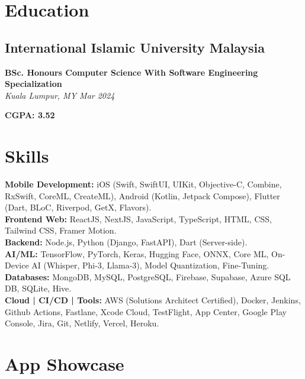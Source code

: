 \documentclass[10pt,letterpaper]{article} %
\newcommand{\jobDetailsLine}[1]{\noindent\textit{#1}\par\vspace{0.5ex}}
\newcommand{\skillCategory}[1]{\noindent\textbf{#1: }}
\begin{document}
\section{Education}
\subsection*{International Islamic University Malaysia} %
\noindent\textbf{BSc. Honours Computer Science With Software Engineering Specialization} \\
\jobDetailsLine{Kuala Lumpur, MY \textbullet{} Mar 2024}
\textbf{CGPA: 3.52}

\section{Skills}
\skillCategory{Mobile Development} iOS (Swift, SwiftUI, UIKit, Objective-C, Combine, RxSwift, CoreML, CreateML), Android (Kotlin, Jetpack Compose), Flutter (Dart, BLoC, Riverpod, GetX, Flavors). \\ \vspace{0.5ex}
\skillCategory{Frontend Web} ReactJS, NextJS, JavaScript, TypeScript, HTML, CSS, Tailwind CSS, Framer Motion. \\ \vspace{0.5ex}
\skillCategory{Backend} Node.js, Python (Django, FastAPI), Dart (Server-side). \\ \vspace{0.5ex}
\skillCategory{AI/ML} TensorFlow, PyTorch, Keras, Hugging Face, ONNX, Core ML, On-Device AI (Whisper, Phi-3, Llama-3), Model Quantization, Fine-Tuning. \\ \vspace{0.5ex}
\skillCategory{Databases} MongoDB, MySQL, PostgreSQL, Firebase, Supabase, Azure SQL DB, SQLite, Hive. \\ \vspace{0.5ex}
\skillCategory{Cloud | CI/CD | Tools} AWS (Solutions Architect Certified), Docker, Jenkins, Github Actions, Fastlane, Xcode Cloud, TestFlight, App Center, Google Play Console, Jira, Git, Netlify, Vercel, Heroku.

\section{App Showcase}
\end{document}
